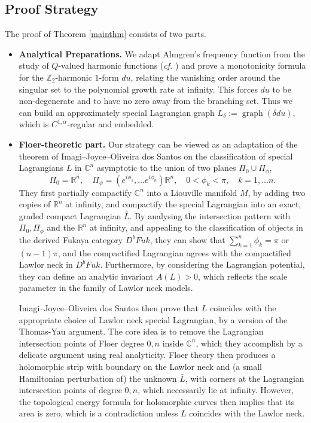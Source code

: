 \documentclass[11pt,a4paper]{article}
\numberwithin{equation}{section}%
\theoremstyle{definition}
\newcommand{\cf}{\emph{cf.} }
\newcommand{\R}{\mathbb{R}}
\newcommand{\C}{\mathbb{C}}
\newcommand{\Z}{\mathbb{Z}}
\begin{document}
\subsection{Proof Strategy}

The proof of Theorem \ref{mainthm} consists of two parts.
\begin{itemize}
    \item \textbf{Analytical Preparations.} We adapt Almgren's frequency function from the study of $Q$-valued harmonic functions (\cf \cite{DeLellis-Spadaro}) and prove a monotonicity formula for the $\Z_2$-harmonic $1$-form $du$, relating the vanishing order around the singular set to the polynomial growth rate at infinity. This forces $du$ to be non-degenerate and to have no zero away from the branching set. Thus we can build an approximately special Lagrangian graph
    $L_\delta:=\operatorname{graph}(\delta du)$, which is 
$C^{1,\alpha}$-regular and embedded.



    \item \textbf{Floer-theoretic part.}
    Our strategy can be viewed as an adaptation of the theorem of Imagi--Joyce--Oliveira dos Santos \cite{IJS} on the classification of special Lagrangians $L$ in $\C^n$ asymptotic 
    to the union of two planes $\Pi_0\cup \Pi_\phi$, 
    \[
    \Pi_0=\R^n,\quad \Pi_\phi= (e^{i\phi_1},\ldots e^{i\phi_n})\R^n,\quad 0<\phi_k<\pi,\quad  k=1,\ldots n.
    \]
    They first partially compactify $\C^n$ into a Liouville manifold $M$, by adding two copies of $\R^n$ at infinity, and compactify the special Lagrangian into an exact, graded compact Lagrangian $\bar{L}$. By analysing the intersection pattern with $\Pi_0, \Pi_\phi$ and the $\R^n$ at infinity, and appealing to the classification of objects in the derived Fukaya category $D^bFuk$, they can show that $\sum\limits_{k=1}^n \phi_k=\pi$ or $(n-1)\pi$, and the compactified Lagrangian agrees with the compactified Lawlor neck in $D^bFuk$. Furthermore, by considering the Lagrangian potential, they can define an analytic invariant $A(L)>0$, which reflects the scale parameter in the family of Lawlor neck models.
    

Imagi--Joyce--Oliveira dos Santos then prove that $L$ coincides with the appropriate choice of Lawlor neck special Lagrangian, by a version of the Thomas-Yau argument. The core idea is to remove the Lagrangian intersection points of Floer degree $0,n$ inside $\C^n$, which they accomplish by a delicate argument using real analyticity. Floer theory then produces a holomorphic strip with boundary on the Lawlor neck and (a small Hamiltonian perturbation of) the unknown $\bar L$, with corners at the Lagrangian intersection points of degree $0,n$, which necessarily lie at infinity. However, the topological energy formula for holomorphic curves then implies that its area is zero, which is a contradiction unless $L$ coincides with the Lawlor neck.


\end{itemize}
\end{document}
